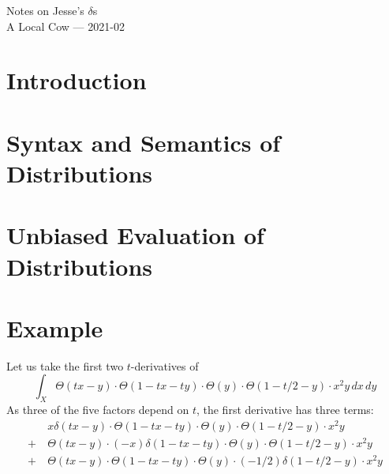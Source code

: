 \documentclass{article}
\begin{document}
    \begin{center}
        \Large Notes on Jesse's $\delta$s\\
        \large A Local Cow --- 2021-02
    \end{center}

\section*{Introduction}
    
\section*{Syntax and Semantics of Distributions}
    
\section*{Unbiased Evaluation of Distributions}
\section*{Example}
    Let us take the first two $t$-derivatives of 
    $$
        \int_X
        \Theta(tx-y)\cdot\Theta(1-tx-ty)\cdot\Theta(y)\cdot\Theta(1-t/2-y)
        \cdot x^2 y
        \,dx\,dy
    $$
    As three of the five factors depend on $t$,
    the first derivative has three terms:
    \begin{align*}
        &~x\delta(tx-y)\cdot\Theta(1-tx-ty)\cdot\Theta(y)\cdot\Theta(1-t/2-y) \cdot x^2 y\\
        +
        &~\Theta(tx-y)\cdot(-x)\delta(1-tx-ty)\cdot\Theta(y)\cdot\Theta(1-t/2-y) \cdot x^2 y\\
        +
        &~\Theta(tx-y)\cdot\Theta(1-tx-ty)\cdot\Theta(y)\cdot(-1/2)\delta(1-t/2-y) \cdot x^2 y
    \end{align*}
\end{document}

